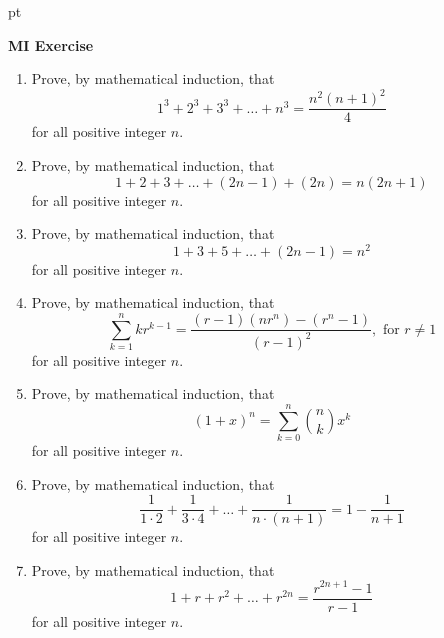\documentclass[12pt]{article}
\begin{document}
 pt
\begin{center}
	{\large \bf MI Exercise}\\
	\vspace{2 mm}

\end{center}
\vspace{0.05cm}

\begin{enumerate}
	\item Prove, by mathematical induction, that $$1^3+2^3+3^3+\ldots + n^3 = \dfrac{n^2(n+1)^2}{4}$$ for all positive integer $n$.
	\item Prove, by mathematical induction, that $$1+2+3+\ldots+(2n-1)+(2n)=n(2n+1)$$ for all positive integer $n$.
	\item Prove, by mathematical induction, that $$1+3+5+\ldots+(2n-1)=n^2$$ for all positive integer $n$.
	\item Prove, by mathematical induction, that $$\sum_{k=1}^{n}kr^{k-1}=\dfrac{(r-1)(nr^n)-(r^n-1)}{(r-1)^2},\text{ for }r \neq 1$$ for all positive integer $n$.	
	\item Prove, by mathematical induction, that $$(1+x)^n=\sum_{k=0}^{n}\binom{n}{k}x^k$$ for all positive integer $n$.	
	\item Prove, by mathematical induction, that $$\dfrac{1}{1\cdot2}+\dfrac{1}{3\cdot4}+\ldots+\dfrac{1}{n\cdot(n+1)}=1-\dfrac{1}{n+1}$$ for all positive integer $n$.	
	\item Prove, by mathematical induction, that $$1+r+r^2+\ldots+r^{2n}=\dfrac{r^{2n+1}-1}{r-1}$$ for all positive integer $n$.		
	



\end{enumerate}
\end{document}

